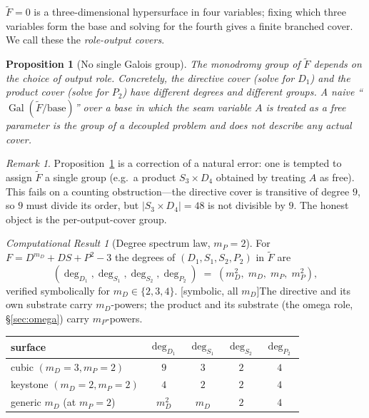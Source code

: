 \documentclass[11pt]{article}
\theoremstyle{plain}
\newtheorem{proposition}{Proposition}
\theoremstyle{definition}
\theoremstyle{remark}
\newtheorem{result}{Computational Result}
\newtheorem{remark}{Remark}
\newcommand{\Symbolic}{\textsf{[symbolic, all $m_D$]}}
\newcommand{\Gal}{\operatorname{Gal}}
\newcommand{\Ftil}{\widetilde{F}}
\begin{document}
$\Ftil=0$ is a three-dimensional hypersurface in four variables; fixing which
three variables form the base and solving for the fourth gives a finite branched
cover. We call these the \emph{role-output covers}.

\begin{proposition}[No single Galois group]
\label{prop:nosingle}
The monodromy group of $\Ftil$ depends on the choice of output role. Concretely,
the directive cover (solve for $D_1$) and the product cover (solve for $P_2$) have
different degrees and different groups. A naive ``$\Gal(\Ftil/\text{base})$'' over
a base in which the seam variable $A$ is treated as a free parameter is the group
of a \emph{decoupled} problem and does not describe any actual cover.
\end{proposition}

\begin{remark}
Proposition~\ref{prop:nosingle} is a correction of a natural error: one is tempted
to assign $\Ftil$ a single group (e.g.\ a product $S_3\times D_4$ obtained by
treating $A$ as free). This fails on a counting obstruction---the directive cover
is transitive of degree $9$, so $9$ must divide its order, but
$|S_3\times D_4|=48$ is not divisible by $9$. The honest object is the
per-output-cover group.
\end{remark}

\begin{result}[Degree spectrum law, $m_P=2$]
\label{res:spectrum}
For $F=D^{m_D}+DS+P^2-3$ the degrees of $(D_1,S_1,S_2,P_2)$ in $\Ftil$ are
\[
  (\deg_{D_1},\deg_{S_1},\deg_{S_2},\deg_{P_2}) \;=\; (m_D^2,\; m_D,\; m_P,\; m_P^2),
\]
verified symbolically for $m_D\in\{2,3,4\}$. \Symbolic\quad The directive and its
own substrate carry $m_D$-powers; the product and its substrate (the omega role,
\S\ref{sec:omega}) carry $m_P$-powers.
\end{result}

\begin{center}
\begin{tabular}{lcccc}
\toprule
surface & $\deg_{D_1}$ & $\deg_{S_1}$ & $\deg_{S_2}$ & $\deg_{P_2}$ \\
\midrule
cubic $(m_D{=}3,m_P{=}2)$ & $9$ & $3$ & $2$ & $4$ \\
keystone $(m_D{=}2,m_P{=}2)$ & $4$ & $2$ & $2$ & $4$ \\
generic $m_D$ (at $m_P{=}2$) & $m_D^2$ & $m_D$ & $2$ & $4$ \\
\bottomrule
\end{tabular}
\end{center}
\end{document}
